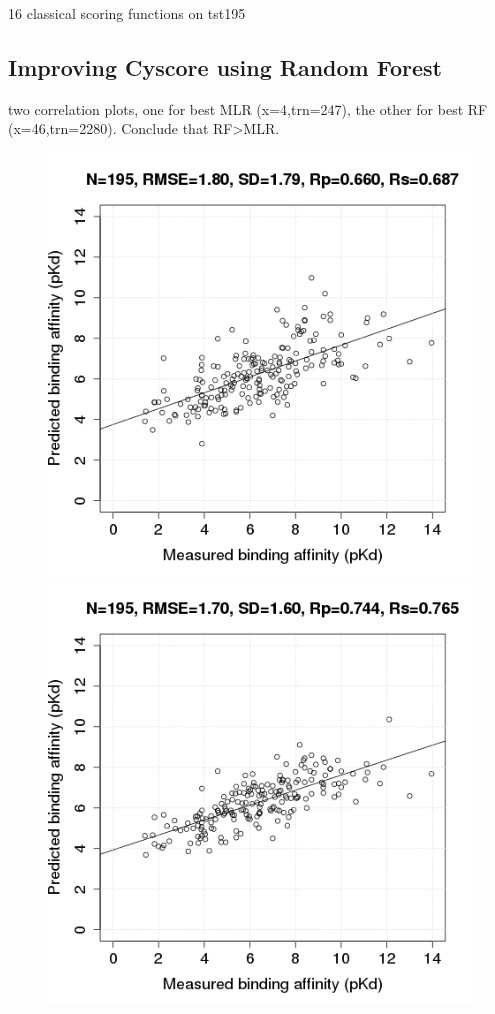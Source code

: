 \documentclass[journal=jacsat,manuscript=article]{achemso}
\begin{document}
16 classical scoring functions on tst195 \cite{1313}

\subsection{Improving Cyscore using Random Forest}

two correlation plots, one for best MLR (x=4,trn=247), the other for best RF (x=46,trn=2280). Conclude that RF>MLR.

\begin{figure}
\includegraphics[width=1.4\linewidth,natwidth=480,natheight=480]{../rfcyscore/x4/mlr/trn-247-tst-195-yp.png}
\endminipage\hfill
{}
\includegraphics[width=1.4\linewidth,natwidth=480,natheight=480]{../rfcyscore/x46/rf/trn-2280-tst-195-yp.png}

\end{figure}
\end{document}
